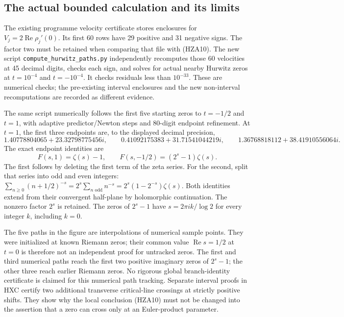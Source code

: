 \documentclass[11pt]{article}
\theoremstyle{definition}
\begin{document}
\subsection{The actual bounded calculation and its limits}

The existing programme velocity certificate stores enclosures for
$V_j=2\operatorname{Re}\rho_j'(0)$. Its first 60 rows have 29
positive and 31 negative signs. The factor two must be retained when
comparing that file with (HZA10). The new script
\texttt{compute\_hurwitz\_paths.py} independently recomputes those
60 velocities at 45 decimal digits, checks each sign, and solves
for actual nearby Hurwitz zeros at $t=10^{-4}$ and $t=-10^{-4}$.
It checks residuals less than $10^{-33}$. These are numerical checks;
the pre-existing interval enclosures and the new non-interval
recomputations are recorded as different evidence.

The same script numerically follows the first five starting zeros
to $t=-1/2$ and $t=1$, with adaptive predictor/Newton steps and
80-digit endpoint refinement. At $t=1$, the first three endpoints
are, to the displayed decimal precision,
\[
 1.40778804065+23.32798775456i,\qquad
 0.41092175383+31.71541044219i,\qquad
 1.36768818112+38.41910556064i.
\]
The exact endpoint identities are
\begin{equation}\tag{HZA13}
 F(s,1)=\zeta(s)-1,\qquad
 F(s,-1/2)=(2^s-1)\zeta(s).
\end{equation}
The first follows by deleting the first term of the zeta series.
For the second, split that series into odd and even integers:
$\sum_{n\ge0}(n+1/2)^{-s}=2^s\sum_{n\text{ odd}}n^{-s}
=2^s(1-2^{-s})\zeta(s)$. Both identities extend from their
convergent half-plane by holomorphic continuation. The nonzero
factor $2^s$ is retained. The zeros of $2^s-1$ have
$s=2\pi i k/\log2$ for every integer $k$, including $k=0$.

The five paths in the figure are interpolations of numerical sample
points. They were initialized at known Riemann zeros; their common
value $\operatorname{Re}s=1/2$ at $t=0$ is therefore not an
independent proof for untracked zeros. The first and third numerical
paths reach the first two positive imaginary zeros of $2^s-1$;
the other three reach earlier Riemann zeros. No rigorous global
branch-identity certificate is claimed for this numerical path
tracking. Separate interval proofs in HXC certify two additional
transverse critical-line crossings at strictly positive shifts.
They show why the local conclusion (HZA10) must not be changed into
the assertion that a zero can cross only at an Euler-product parameter.

\clearpage
\end{document}
